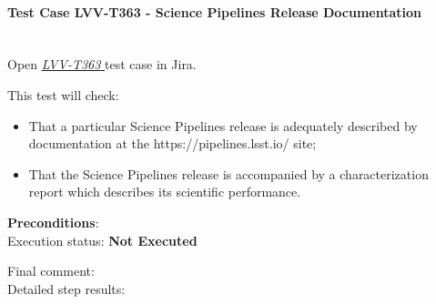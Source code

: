 \documentclass[DM,lsstdraft,STR,toc]{lsstdoc}
\providecommand{\tightlist}{
  \setlength{\itemsep}{0pt}\setlength{\parskip}{0pt}}
\begin{document}
    \paragraph{Test Case LVV-T363 - Science Pipelines Release Documentation
 }\mbox{}\\

Open  \href{https://jira.lsstcorp.org/secure/Tests.jspa#/testCase/LVV-T363}{\textit{ LVV-T363 } }
test case in Jira.

    This test will check:

\begin{itemize}
\tightlist
\item
  That a particular Science Pipelines release is adequately described by
  documentation at the https://pipelines.lsst.io/ site;
\item
  That the Science Pipelines release is accompanied by a
  characterization report which describes its scientific performance.
\end{itemize}


    \textbf{ Preconditions}:\\
    

    Execution status: {\bf Not Executed }

    Final comment:\\


    Detailed step results:
\end{document}
